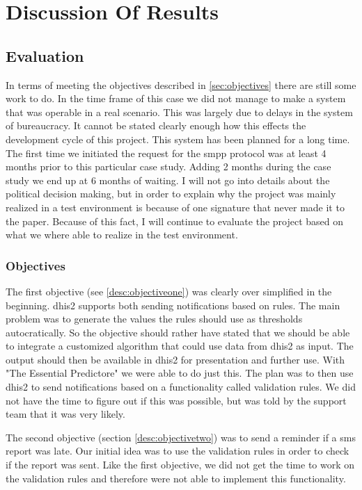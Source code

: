 \chapter{Discussion Of Results}

\section{Evaluation}
In terms of meeting the objectives described in \ref{sec:objectives} there are still some work to do.
In the time frame of this case we did not manage to make a system that was operable in a real scenario. 
This was largely due to delays in the system of bureaucracy. 
It cannot be stated clearly enough how this effects the development cycle of this project.
This system has been planned for a long time. 
The first time we initiated the request for the \gls{smpp} protocol was at least 4 months prior to this particular case study. Adding 2 months during the case study we end up at 6 months of waiting.
I will not go into details about the political decision making, but in order to explain why the project was mainly realized in a test environment is because of one signature that never made it to the paper.
Because of this fact, I will continue to evaluate the project based on what we where able to realize in the test environment.

\subsection{Objectives}
The first objective (see \ref{desc:objectiveone}) was clearly over simplified in the beginning.
\gls{dhis2} supports both sending notifications based on rules. The main problem was to generate the values the rules should use as thresholds autocratically. So the objective should rather have stated that we should be able to integrate a customized algorithm that could use data from \gls{dhis2} as input. The output should then be available in \gls{dhis2} for presentation and further use. 
With "The Essential Predictore" we were able to do just this. The plan was to then use \gls{dhis2} to send notifications based on a functionality called validation rules.
We did not have the time to figure out if this was possible, but was told by the support team that it was very likely. 

The second objective (section \ref{desc:objectivetwo}) was to send a reminder if a \gls{sms} report was late. Our initial idea was to use the validation rules in order to check if the report was sent. Like the first objective, we did not get the time to work on the validation rules and therefore were not able to implement this functionality.

